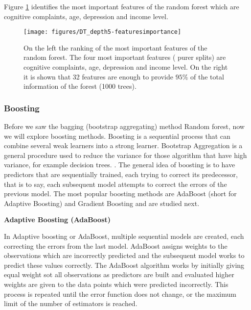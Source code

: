 \documentclass[11pt]{article}
\theoremstyle{definition}
\theoremstyle{remark}
\begin{document}
{Figure \ref{fig:rf-features} identifies the most important features of the random forest which are cognitive complaints, age, depression and income level.
\begin{figure}[H]
        \centering
        \texttt{[image: figures/DT\_depth5-featuresimportance]}
        \caption{On the left the ranking of the most important features of the random forest. The four most important features ( purer splits) are cognitive complaints, age, depression and income level. On the right it is shown that 32 features are enough to provide $95\%$ of the total information of the forest (1000 trees).   
        } \label{fig:rf-features}
\end{figure}

\subsubsection{Boosting}
\label{se:resgradboosting}

Before we saw the bagging (bootstrap aggregating) method Random forest, now we will explore boosting methods.
Boosting is a sequential process that can combine several weak learners into a strong learner. Bootstrap Aggregation is a general procedure used to reduce the variance for those algorithm that have high variance, for example  decision trees. . The general idea of boosting is to have predictors that are sequentially trained, each trying to correct its predecessor, that is to say, each subsequent model attempts to correct the errors of the previous model.
The most popular boosting methods are AdaBoost (short for Adaptive Boosting) and Gradient Boosting and are studied next.

\textbf{Adaptive Boosting (AdaBoost)}

In Adaptive boosting or AdaBoost, multiple sequential models are created, each correcting the errors from the last model. AdaBoost assigns weights to the observations which are incorrectly predicted and the subsequent model works to predict these values correctly. The AdaBoost algorithm works by initially giving equal weight sot all observations as predictors are built and evaluated 
higher weights are given to the data points which were predicted incorrectly. This process is repeated until the error function does not change, or the maximum limit of the number of estimators is reached.

}
\end{document}
